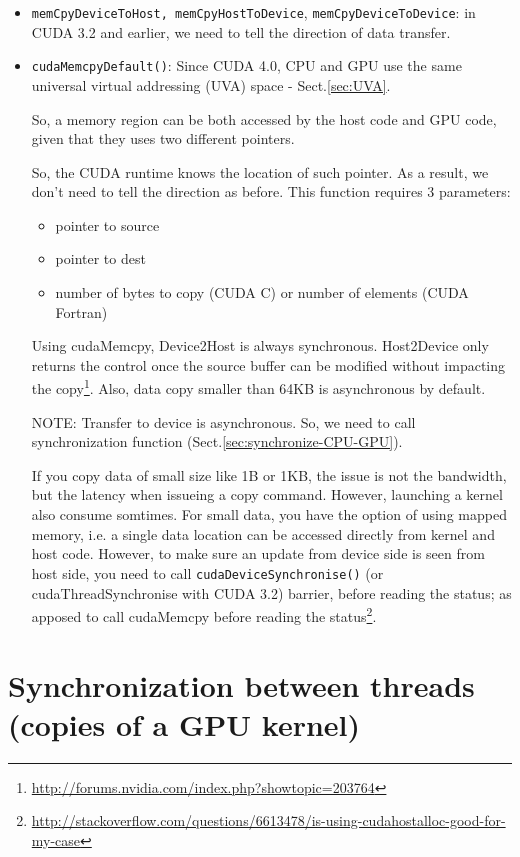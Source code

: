 \begin{itemize}
  \item \verb!memCpyDeviceToHost, memCpyHostToDevice!,
  \verb!memCpyDeviceToDevice!: in CUDA 3.2 and earlier, we need to tell the
  direction of data transfer. 
  
  
   \item \verb!cudaMemcpyDefault()!: Since CUDA 4.0, CPU and GPU use the
  same universal virtual addressing (UVA) space - Sect.\ref{sec:UVA}. 
  
  So, a memory region can be both accessed by the host code and GPU code, given
  that they uses two different pointers.
  
  So, the CUDA runtime knows the location of such pointer. As a result, we don't need to tell
  the direction as before.  This function requires 3 parameters:
  \begin{itemize}
  \item pointer to source
  \item pointer to dest
  \item number of bytes to copy (CUDA C) or number of elements (CUDA Fortran)
  \end{itemize}
  
Using cudaMemcpy, Device2Host is always synchronous. Host2Device only returns
the control once the source buffer can be modified without impacting the
copy\footnote{\url{http://forums.nvidia.com/index.php?showtopic=203764}}. Also,
data copy smaller than 64KB is asynchronous by default. 
 
NOTE: Transfer to device is asynchronous. So, we need to call synchronization
function (Sect.\ref{sec:synchronize-CPU-GPU}).


If you copy data of small size like 1B or 1KB, the issue is not the bandwidth,
but the latency when issueing a copy command. However, launching a kernel also
consume somtimes. For small data, you have the option of using mapped memory,
i.e. a single data location can be accessed directly from kernel and host code.
However, to make sure an update from device side is seen from host side, you
need to call \verb!cudaDeviceSynchronise()! (or cudaThreadSynchronise with CUDA
3.2) barrier, before reading the status; as apposed to call cudaMemcpy before
reading the
status\footnote{\url{http://stackoverflow.com/questions/6613478/is-using-cudahostalloc-good-for-my-case}}.
\end{itemize}


\section{Synchronization between threads (copies of a GPU kernel)}
\label{sec:synchronize-threads-in-same-kernel}


